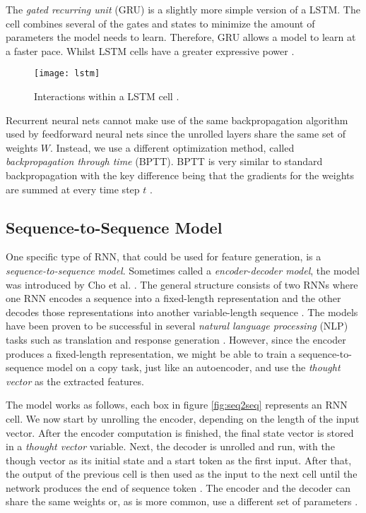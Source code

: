 The \textit{gated recurring unit} (GRU) is a slightly more simple version of a LSTM.
The cell combines several of the gates and states to minimize the amount of parameters the model needs to learn.
Therefore, GRU allows a model to learn at a faster pace.
Whilst LSTM cells have a greater expressive power \cite{hochreiter1997long,LSTM,cho2014learning}.

\begin{figure}[ht]
  \centering
  \texttt{[image: lstm]}
  \caption{Interactions within a LSTM cell \cite{LSTM}.}
  \label{fig:lstm}
\end{figure}

Recurrent neural nets cannot make use of the same backpropagation algorithm used by feedforward neural nets since the unrolled layers share the same set of weights $W$.
Instead, we use a different optimization method, called \textit{backpropagation through time} (BPTT).
BPTT is very similar to standard backpropagation with the key difference being that the gradients for the weights are summed at every time step $t$ \cite{britz_2016}.

\subsection{Sequence-to-Sequence Model} \label{sec:seq2seq}

One specific type of RNN, that could be used for feature generation, is a \textit{sequence-to-sequence model}.
Sometimes called a \textit{encoder-decoder model}, the model was introduced by Cho et al. \cite{cho2014learning}.
The general structure consists of two RNNs where one RNN encodes a sequence into a fixed-length representation and the other decodes those representations into another variable-length sequence \cite{cho2014learning}.
The models have been proven to be successful in several \textit{natural language processing} (NLP) tasks such as translation and response generation \cite{cho2014learning,sutskever_vinyals_le,tensorflowseq2seq}.
However, since the encoder produces a fixed-length representation, we might be able to train a sequence-to-sequence model on a copy task, just like an autoencoder, and use the \textit{thought vector} as the extracted features.

The model works as follows, each box in figure \ref{fig:seq2seq} represents an RNN cell.
We now start by unrolling the encoder, depending on the length of the input vector.
After the encoder computation is finished, the final state vector is stored in a \textit{thought vector} variable.
Next, the decoder is unrolled and run, with the though vector as its initial state and a start token as the first input.
After that, the output of the previous cell is then used as the input to the next cell until the network produces the end of sequence token \cite{cho2014learning}.
The encoder and the decoder can share the same weights or, as is more common, use a different set of parameters \cite{tensorflowseq2seq}.

